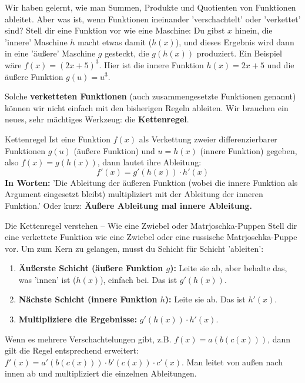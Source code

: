 Wir haben gelernt, wie man Summen, Produkte und Quotienten von Funktionen ableitet. Aber was ist, wenn Funktionen ineinander 'verschachtelt' oder 'verkettet' sind? Stell dir eine Funktion vor wie eine Maschine: Du gibst $x$ hinein, die 'innere' Maschine $h$ macht etwas damit ($h(x)$), und dieses Ergebnis wird dann in eine 'äußere' Maschine $g$ gesteckt, die $g(h(x))$ produziert. Ein Beispiel wäre $f(x) = (2x+5)^3$. Hier ist die innere Funktion $h(x)=2x+5$ und die äußere Funktion $g(u)=u^3$.

Solche \textbf{verketteten Funktionen} (auch zusammengesetzte Funktionen genannt) können wir nicht einfach mit den bisherigen Regeln ableiten. Wir brauchen ein neues, sehr mächtiges Werkzeug: die \textbf{Kettenregel}.

\begin{merksatzumgebung}{Kettenregel}
Ist eine Funktion $f(x)$ als Verkettung zweier differenzierbarer Funktionen $g(u)$ (äußere Funktion) und $u=h(x)$ (innere Funktion) gegeben, also $f(x) = g(h(x))$, dann lautet ihre Ableitung:
\[ f'(x) = g'(h(x)) \cdot h'(x) \]
\textbf{In Worten:} 'Die Ableitung der äußeren Funktion (wobei die innere Funktion als Argument eingesetzt bleibt) multipliziert mit der Ableitung der inneren Funktion.'
Oder kurz: \textbf{Äußere Ableitung mal innere Ableitung.}
\end{merksatzumgebung}

\begin{infoboxumgebung}{Die Kettenregel verstehen – Wie eine Zwiebel oder Matrjoschka-Puppen}
Stell dir eine verkettete Funktion wie eine Zwiebel oder eine russische Matrjoschka-Puppe vor. Um zum Kern zu gelangen, musst du Schicht für Schicht 'ableiten':
\begin{enumerate}
    \item \textbf{Äußerste Schicht (äußere Funktion $g$):} Leite sie ab, aber behalte das, was 'innen' ist ($h(x)$), einfach bei. Das ist $g'(h(x))$.
    \item \textbf{Nächste Schicht (innere Funktion $h$):} Leite sie ab. Das ist $h'(x)$.
    \item \textbf{Multipliziere die Ergebnisse:} $g'(h(x)) \cdot h'(x)$.
\end{enumerate}
Wenn es mehrere Verschachtelungen gibt, z.B. $f(x) = a(b(c(x)))$, dann gilt die Regel entsprechend erweitert: $f'(x) = a'(b(c(x))) \cdot b'(c(x)) \cdot c'(x)$. Man leitet von außen nach innen ab und multipliziert die einzelnen Ableitungen.
\end{infoboxumgebung}

